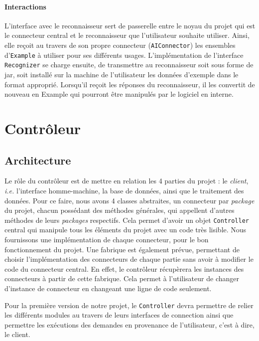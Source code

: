 \paragraph{Interactions}
L'interface avec le reconnaisseur sert de passerelle entre le noyau du projet qui est le connecteur central et le reconnaisseur que l'utilisateur souhaite utiliser. Ainsi, elle reçoit au travers de son propre connecteur (\texttt{AIConnector}) les ensembles d'\texttt{Example} à utiliser pour ses différents usages. L'implémentation de l'interface \texttt{Recognizer} se charge ensuite, de transmettre au reconnaisseur soit sous forme de jar, soit installé sur la machine de l'utilisateur les données d'exemple dans le format approprié. Lorsqu'il reçoit les réponses du reconnaisseur, il les convertit de nouveau en Example qui pourront être manipulés par le logiciel en interne.


\section{Contrôleur}
\subsection{Architecture}

Le rôle du contrôleur est de mettre en relation les 4 parties du projet : le \textit{client}, \textit{i.e.} l'interface homme-machine, la base de données, ainsi que le traitement des données. Pour ce faire, nous avons 4 classes abstraites, un connecteur par \textit{package} du projet, chacun possédant des méthodes générales, qui appellent d'autres méthodes de leurs \textit{packages} respectifs. Cela permet d'avoir un objet \texttt{Controller} central qui manipule tous les éléments du projet avec un code très lisible. Nous fournissons une implémentation de chaque connecteur, pour le bon fonctionnement du projet. Une fabrique est également prévue, permettant de choisir l'implémentation des connecteurs de chaque partie sans avoir à modifier le code du connecteur central. En effet, le contrôleur récupèrera les instances des connecteurs à partir de cette fabrique. Cela permet à l'utilisateur de changer d'instance de connecteur en changeant une ligne de code seulement.

Pour la première version de notre projet, le \texttt{Controller} devra permettre de relier les différents modules au travers de leurs interfaces de connection ainsi que permettre les exécutions des demandes en provenance de l'utilisateur, c'est à dire, le client. 

